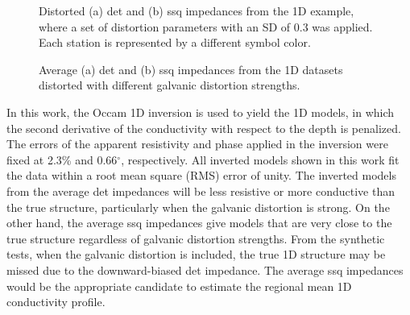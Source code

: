\begin{figure}[t]
	\centering
	\caption[Example of distorted det and ssq impedances from distorted 1D MT dataset]{Distorted (a) det and (b) ssq impedances from the 1D example, where a set of distortion parameters with an SD of 0.3 was applied. Each station is represented by a different symbol color.}
	\label{fig:resp1d_individual_all_distorted_sd3a}
\end{figure}
\begin{figure}[t]
	\centering
	\caption[Average det and ssq impedances from 1D MT datasets distorted with different galvanic distortion strengths]{Average (a) det and (b) ssq impedances from the 1D datasets distorted with different galvanic distortion strengths.}
	\label{fig:resp1d_avg_distorted}
\end{figure}

 
	In this work, the Occam 1D inversion \citep{constable1987a} is used to yield the 1D models, in which the second derivative of the conductivity with respect to the depth is penalized. 
	The errors of the apparent resistivity and phase applied in the inversion were fixed at 2.3\% and 0.66$^\circ$, respectively. All inverted models shown in this work fit the data within a root mean square (RMS) error of unity.
	The inverted models from the average det impedances will be less resistive or more conductive than the true structure, particularly when the galvanic distortion is strong.
	On the other hand, the average ssq impedances give models that are very close to the true structure regardless of galvanic distortion strengths.
	From the synthetic tests, when the galvanic distortion is included, the true 1D structure may be missed due to the downward-biased det impedance. The average ssq impedances would be the appropriate candidate to estimate the regional mean 1D conductivity profile.




